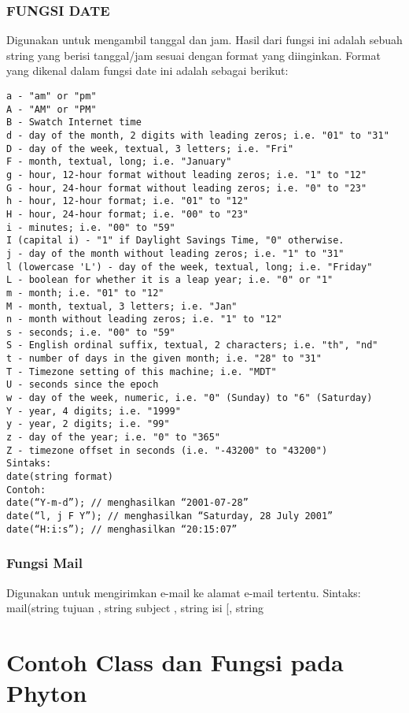 \subsubsection{FUNGSI DATE}
Digunakan untuk mengambil tanggal dan jam. Hasil dari fungsi ini adalah sebuah string
yang berisi tanggal/jam sesuai dengan format yang diinginkan. Format yang dikenal
dalam fungsi date ini adalah sebagai berikut:
\begin{lstlisting}
a - "am" or "pm"
A - "AM" or "PM"
B - Swatch Internet time
d - day of the month, 2 digits with leading zeros; i.e. "01" to "31"
D - day of the week, textual, 3 letters; i.e. "Fri"
F - month, textual, long; i.e. "January"
g - hour, 12-hour format without leading zeros; i.e. "1" to "12"
G - hour, 24-hour format without leading zeros; i.e. "0" to "23"
h - hour, 12-hour format; i.e. "01" to "12"
H - hour, 24-hour format; i.e. "00" to "23"
i - minutes; i.e. "00" to "59"
I (capital i) - "1" if Daylight Savings Time, "0" otherwise.
j - day of the month without leading zeros; i.e. "1" to "31"
l (lowercase 'L') - day of the week, textual, long; i.e. "Friday"
L - boolean for whether it is a leap year; i.e. "0" or "1"
m - month; i.e. "01" to "12"
M - month, textual, 3 letters; i.e. "Jan"
n - month without leading zeros; i.e. "1" to "12"
s - seconds; i.e. "00" to "59"
S - English ordinal suffix, textual, 2 characters; i.e. "th", "nd"
t - number of days in the given month; i.e. "28" to "31"
T - Timezone setting of this machine; i.e. "MDT"
U - seconds since the epoch
w - day of the week, numeric, i.e. "0" (Sunday) to "6" (Saturday)
Y - year, 4 digits; i.e. "1999"
y - year, 2 digits; i.e. "99"
z - day of the year; i.e. "0" to "365"
Z - timezone offset in seconds (i.e. "-43200" to "43200")
Sintaks:
date(string format)
Contoh:
date(“Y-m-d”); // menghasilkan “2001-07-28”
date(“l, j F Y”); // menghasilkan “Saturday, 28 July 2001”
date(“H:i:s”); // menghasilkan “20:15:07”
\end{lstlisting}

\subsubsection{Fungsi Mail}
Digunakan untuk mengirimkan e-mail ke alamat e-mail tertentu.
Sintaks:
mail(string tujuan , string subject , string isi [, string

\section{Contoh Class dan Fungsi pada Phyton}
